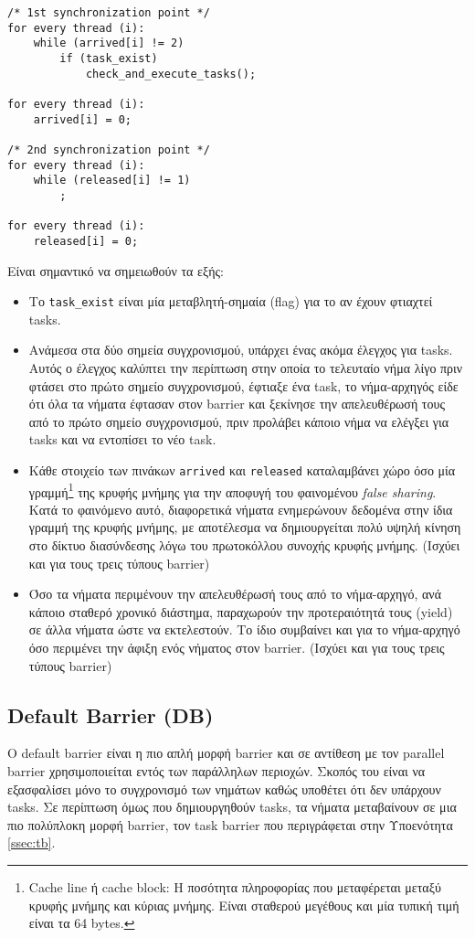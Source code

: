 \begin{lstlisting}[label=prg:pb2, caption=Parallel barrier για το νήμα-αρχηγό.]
/* 1st synchronization point */
for every thread (i):
    while (arrived[i] != 2)
        if (task_exist)
            check_and_execute_tasks();
        
for every thread (i):
    arrived[i] = 0;
   
/* 2nd synchronization point */
for every thread (i):
    while (released[i] != 1)
        ;
        
for every thread (i):
    released[i] = 0;
\end{lstlisting}


\noindent Είναι σημαντικό να σημειωθούν τα εξής:
\begin{itemize}
	\item Το \texttt{task\_exist} είναι μία μεταβλητή-σημαία (flag) για το αν έχουν φτιαχτεί tasks.
	\item Aνάμεσα στα δύο σημεία συγχρονισμού, υπάρχει ένας ακόμα έλεγχος για tasks. Αυτός ο έλεγχος καλύπτει την περίπτωση στην οποία το τελευταίο νήμα λίγο πριν φτάσει στο πρώτο σημείο συγχρονισμού, έφτιαξε ένα task, το νήμα-αρχηγός είδε ότι όλα τα νήματα έφτασαν στον barrier και ξεκίνησε την απελευθέρωσή τους από το πρώτο σημείο συγχρονισμού, πριν προλάβει κάποιο νήμα να ελέγξει για tasks και να εντοπίσει το νέο task.
	\item Κάθε στοιχείο των πινάκων \texttt{arrived} και \texttt{released} καταλαμβάνει χώρο όσο μία γραμμή\footnote{Cache line ή cache block: Η ποσότητα πληροφορίας που μεταφέρεται μεταξύ κρυφής μνήμης και κύριας μνήμης. Είναι σταθερού μεγέθους και μία τυπική τιμή είναι τα 64 bytes.} της κρυφής μνήμης για την αποφυγή του φαινομένου \textit{false sharing}. Κατά το φαινόμενο αυτό, διαφορετικά νήματα ενημερώνουν δεδομένα στην ίδια γραμμή της κρυφής μνήμης, με αποτέλεσμα να δημιουργείται πολύ υψηλή κίνηση στο δίκτυο διασύνδεσης λόγω του πρωτοκόλλου συνοχής κρυφής μνήμης. (Ισχύει και για τους τρεις τύπους barrier)
	\item Όσο τα νήματα περιμένουν την απελευθέρωσή τους από το νήμα-αρχηγό, ανά κάποιο σταθερό χρονικό διάστημα, παραχωρούν την προτεραιότητά τους (yield) σε άλλα νήματα ώστε να εκτελεστούν. Το ίδιο συμβαίνει και για το νήμα-αρχηγό όσο περιμένει την άφιξη ενός νήματος στον barrier. (Ισχύει και για τους τρεις τύπους barrier)
\end{itemize}


\subsection{Default Barrier (DB)}
Ο default barrier είναι η πιο απλή μορφή barrier και σε αντίθεση με τον parallel barrier χρησιμοποιείται εντός των παράλληλων περιοχών. Σκοπός του είναι να εξασφαλίσει μόνο το συγχρονισμό των νημάτων καθώς υποθέτει ότι δεν υπάρχουν tasks. Σε περίπτωση όμως που δημιουργηθούν tasks, τα νήματα μεταβαίνουν σε μια πιο πολύπλοκη μορφή barrier, τον task barrier που περιγράφεται στην Υποενότητα \ref{ssec:tb}. 


